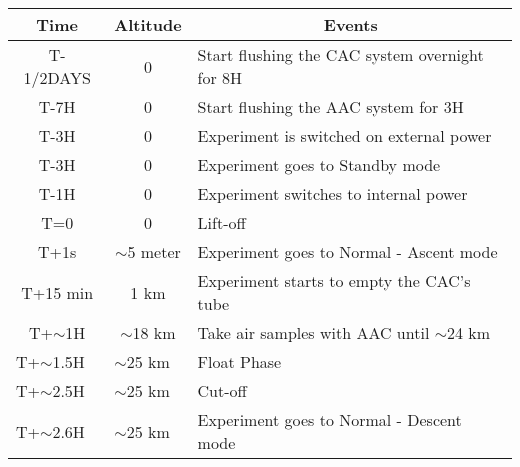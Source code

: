 \begin{table}[H]
\centering


\begin{tabular}{|l|l|m{}|}
\hline
\multicolumn{1}{|c|}{\textbf{Time}}       & \multicolumn{1}{c|}{\textbf{Altitude}}      & \multicolumn{1}{c|}{\textbf{Events}}                              \\ \hline
\multicolumn{1}{|c|}{T-1/2DAYS}    & \multicolumn{1}{c|}{0}             & Start flushing the CAC system overnight for 8H                           \\ \hline
\multicolumn{1}{|c|}{T-7H}    & \multicolumn{1}{c|}{0}             & Start flushing the AAC system for 3H                                \\ \hline
\multicolumn{1}{|c|}{T-3H}    & \multicolumn{1}{c|}{0}             & Experiment is switched on external power                                \\ \hline
\multicolumn{1}{|c|}{T-3H}    & \multicolumn{1}{c|}{0}             & Experiment goes to Standby mode                          \\ \hline
\multicolumn{1}{|c|}{T-1H}    & \multicolumn{1}{c|}{0}             & Experiment switches to internal power                                \\ \hline
\multicolumn{1}{|c|}{T=0}        & \multicolumn{1}{c|}{0}             & Lift-off                                                 \\ \hline
\multicolumn{1}{|c|}{T+1s}       & \multicolumn{1}{c|}{$\sim$5 meter} & Experiment goes to Normal - Ascent mode                  \\ \hline
\multicolumn{1}{|c|}{T+15 min}   & \multicolumn{1}{c|}{1 km}          & Experiment starts to empty the CAC's tube\\ \hline
\multicolumn{1}{|c|}{T+$\sim$1H} & \multicolumn{1}{c|}{$\sim$18 km}   & Take air samples with AAC until $\sim$24 km                       \\ \hline
T+$\sim$1.5H                     & $\sim$25 km                        & Float Phase                                           \\ \hline
T+$\sim$2.5H                     & $\sim$25 km                        & Cut-off                                                  \\ \hline
T+$\sim$2.6H                     & $\sim$25 km                        & Experiment goes to Normal - Descent mode                 \\ \hline

\end{tabular}
\end{table}
